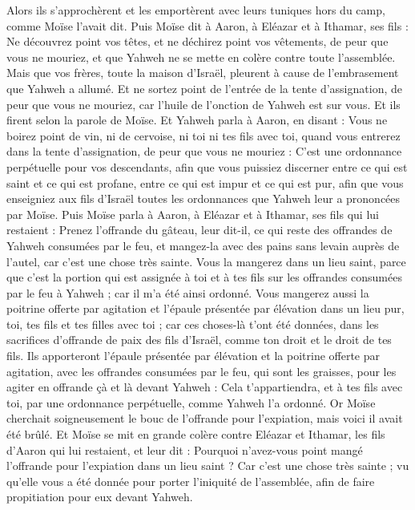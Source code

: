 \begin{multicols}{2}
Alors ils s'approchèrent et les emportèrent avec leurs tuniques hors du camp, comme Moïse l'avait dit.
Puis Moïse dit à Aaron, à Eléazar et à Ithamar, ses fils : Ne découvrez point vos têtes, et ne déchirez point vos vêtements, de peur que vous ne mouriez, et que Yahweh ne se mette en colère contre toute l'assemblée. Mais que vos frères, toute la maison d'Israël, pleurent à cause de l'embrasement que Yahweh a allumé.
Et ne sortez point de l'entrée de la tente d'assignation, de peur que vous ne mouriez, car l'huile de l'onction de Yahweh est sur vous. Et ils firent selon la parole de Moïse.
Et Yahweh parla à Aaron, en disant :
Vous ne boirez point de vin, ni de cervoise, ni toi ni tes fils avec toi, quand vous entrerez dans la tente d'assignation, de peur que vous ne mouriez : C'est une ordonnance perpétuelle pour vos descendants,
afin que vous puissiez discerner entre ce qui est saint et ce qui est profane, entre ce qui est impur et ce qui est pur,
afin que vous enseigniez aux fils d'Israël toutes les ordonnances que Yahweh leur a prononcées par Moïse.
Puis Moïse parla à Aaron, à Eléazar et à Ithamar, ses fils qui lui restaient : Prenez l'offrande du gâteau, leur dit-il, ce qui reste des offrandes de Yahweh consumées par le feu, et mangez-la avec des pains sans levain auprès de l'autel, car c'est une chose très sainte.
Vous la mangerez dans un lieu saint, parce que c'est la portion qui est assignée à toi et à tes fils sur les offrandes consumées par le feu à Yahweh ; car il m'a été ainsi ordonné.
Vous mangerez aussi la poitrine offerte par agitation et l'épaule présentée par élévation dans un lieu pur, toi, tes fils et tes filles avec toi ; car ces choses-là t'ont été données, dans les sacrifices d'offrande de paix des fils d'Israël, comme ton droit et le droit de tes fils.
Ils apporteront l'épaule présentée par élévation et la poitrine offerte par agitation, avec les offrandes consumées par le feu, qui sont les graisses, pour les agiter en offrande çà et là devant Yahweh : Cela t'appartiendra, et à tes fils avec toi, par une ordonnance perpétuelle, comme Yahweh l'a ordonné.
Or Moïse cherchait soigneusement le bouc de l'offrande pour l'expiation, mais voici il avait été brûlé. Et Moïse se mit en grande colère contre Eléazar et Ithamar, les fils d'Aaron qui lui restaient, et leur dit :
Pourquoi n'avez-vous point mangé l'offrande pour l'expiation dans un lieu saint ? Car c'est une chose très sainte ; vu qu'elle vous a été donnée pour porter l'iniquité de l'assemblée, afin de faire propitiation pour eux devant Yahweh.

\end{multicols}
